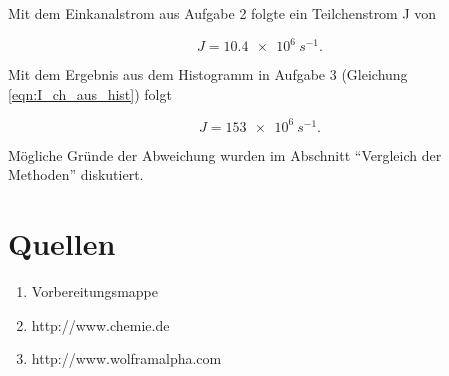 \documentclass[a4paper,ngerman]{scrartcl}
\begin{document}
Mit dem Einkanalstrom aus Aufgabe 2 folgte ein Teilchenstrom J von

\begin{equation}
J = \SI{10.4e6}{s^{-1}}.
\end{equation}

Mit dem Ergebnis aus dem Histogramm in Aufgabe 3 (Gleichung \ref{eqn:I_ch_aus_hist}) folgt

\begin{equation}
J = \SI{153e6}{s^{-1}}.
\end{equation}

Mögliche Gründe der Abweichung wurden im Abschnitt "`Vergleich der Methoden"' diskutiert.

\clearpage
\section{Quellen}
\begin{enumerate}
\item Vorbereitungsmappe \label{ref:mappe}
\item http://www.chemie.de \label{ref:chemie.de}
\item http://www.wolframalpha.com \label{ref:wolfram}
\end{enumerate}
\end{document}
